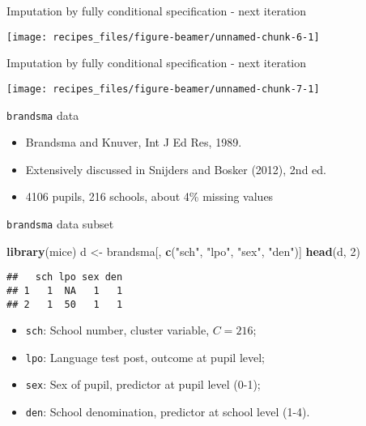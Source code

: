 \documentclass[ignorenonframetext,aspectratio=43]{beamer}
\newenvironment{Shaded}{\begin{snugshade}}{\end{snugshade}}
\newcommand{\KeywordTok}[1]{\textcolor[rgb]{0.13,0.29,0.53}{\textbf{#1}}}
\newcommand{\DecValTok}[1]{\textcolor[rgb]{0.00,0.00,0.81}{#1}}
\newcommand{\StringTok}[1]{\textcolor[rgb]{0.31,0.60,0.02}{#1}}
\newcommand{\NormalTok}[1]{#1}
\providecommand{\tightlist}{%
  \setlength{\itemsep}{0pt}\setlength{\parskip}{0pt}}
\begin{document}
\begin{frame}{Imputation by fully conditional specification - next
iteration}

\begin{center}\texttt{[image: recipes\_files/figure-beamer/unnamed-chunk-6-1]} \end{center}

\end{frame}

\begin{frame}{Imputation by fully conditional specification - next
iteration}

\begin{center}\texttt{[image: recipes\_files/figure-beamer/unnamed-chunk-7-1]} \end{center}

\end{frame}

\begin{frame}{\texttt{brandsma} data}

\begin{itemize}
\tightlist
\item
  Brandsma and Knuver, Int J Ed Res, 1989.
\item
  Extensively discussed in Snijders and Bosker (2012), 2nd ed.
\item
  4106 pupils, 216 schools, about 4\% missing values
\end{itemize}

\end{frame}

\begin{frame}[fragile]{\texttt{brandsma} data subset}

\begin{Shaded}
\begin{Highlighting}[]
\KeywordTok{library}\NormalTok{(mice)}
\NormalTok{d <-}\StringTok{ }\NormalTok{brandsma[, }\KeywordTok{c}\NormalTok{(}\StringTok{"sch"}\NormalTok{, }\StringTok{"lpo"}\NormalTok{, }\StringTok{"sex"}\NormalTok{, }\StringTok{"den"}\NormalTok{)]}
\KeywordTok{head}\NormalTok{(d, }\DecValTok{2}\NormalTok{)}
\end{Highlighting}
\end{Shaded}

\begin{verbatim}
##   sch lpo sex den
## 1   1  NA   1   1
## 2   1  50   1   1
\end{verbatim}

\begin{itemize}
\tightlist
\item
  \texttt{sch}: School number, cluster variable, \(C = 216\);
\item
  \texttt{lpo}: Language test post, outcome at pupil level;
\item
  \texttt{sex}: Sex of pupil, predictor at pupil level (0-1);
\item
  \texttt{den}: School denomination, predictor at school level (1-4).
\end{itemize}

\end{frame}
\end{document}
